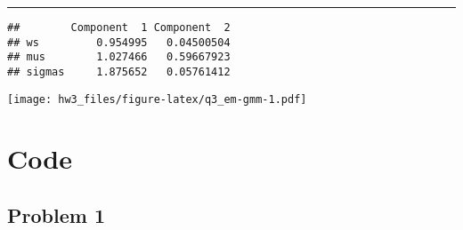 \documentclass[
]{article}
\begin{document}
\begin{center}\rule{0.5\linewidth}{0.5pt}\end{center}

\begin{verbatim}
##        Component  1 Component  2
## ws         0.954995   0.04500504
## mus        1.027466   0.59667923
## sigmas     1.875652   0.05761412
\end{verbatim}

\texttt{[image: hw3\_files/figure-latex/q3\_em-gmm-1.pdf]}

\hypertarget{code}{%
\section{Code}\label{code}}

\hypertarget{problem-1-1}{%
\subsection{Problem 1}\label{problem-1-1}}
\end{document}

